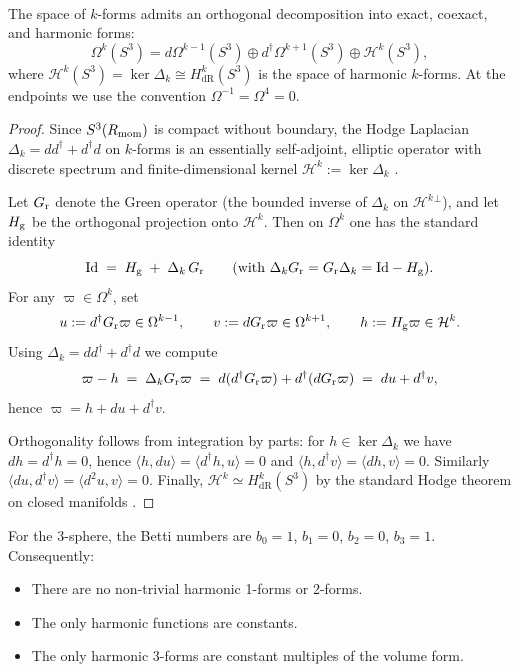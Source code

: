 \documentclass[11pt]{article}
\begin{document}
\begin{theorem}
\label{p1a:theorem:atlas-hodge-decomposition-a115d4d}

\mbox{}\\[6pt] 
The space of $k$-forms admits an orthogonal decomposition into exact, coexact, and harmonic forms:
\[
\Omega^k(S^3) = d\Omega^{k-1}(S^3) \oplus d^\dagger\Omega^{k+1}(S^3) \oplus \mathcal{H}^k(S^3),
\]
where $\mathcal{H}^k(S^3) = \ker \Delta_k \cong H_{\text{dR}}^k(S^3)$ is the space of harmonic $k$-forms. At the endpoints we use the convention $\Omega^{-1}=\Omega^4=0$.
\cite{warner1983foundations}
\end{theorem}
\begin{proof}
Since $S^3(R_{\mathrm{mom}})$ is compact without boundary, the Hodge Laplacian
$\Delta_k = dd^\dagger + d^\dagger d$ on $k$-forms is an essentially self-adjoint,
elliptic operator with discrete spectrum and finite-dimensional kernel
$\mathcal H^k:=\ker \Delta_k$ \cite{warner1983foundations,berline1992heat}.

Let $G_{\mathrm r}$ denote the Green operator (the bounded inverse of $\Delta_k$ on
$\mathcal H^k{}^\perp$), and let $H_{\mathrm g}$ be the orthogonal projection onto $\mathcal H^k$.
Then on $\Omega^k$ one has the standard identity
\[
\mathrm{Id} \;=\; H_{\mathrm g} \;+\; \Delta_k\, G_{\mathrm r}
\qquad\text{(with $\Delta_k G_{\mathrm r} = G_{\mathrm r} \Delta_k = \mathrm{Id}-H_{\mathrm g}$)}.
\]
For any $\varpi\in\Omega^k$, set
\[
u := d^\dagger G_{\mathrm r}\varpi \in \Omega^{k-1}, \qquad
v := d G_{\mathrm r}\varpi \in \Omega^{k+1}, \qquad
h := H_{\mathrm g}\varpi \in \mathcal H^k.
\]
Using $\Delta_k = dd^\dagger + d^\dagger d$ we compute
\[
\varpi - h \;=\; \Delta_k G_{\mathrm r}\varpi \;=\; d(d^\dagger G_{\mathrm r}\varpi) + d^\dagger(dG_{\mathrm r}\varpi)
\;=\; du + d^\dagger v,
\]
hence $\varpi = h + du + d^\dagger v$.

Orthogonality follows from integration by parts:
for $h\in\ker\Delta_k$ we have $dh=d^\dagger h=0$, hence
$\langle h,du\rangle=\langle d^\dagger h,u\rangle=0$ and
$\langle h,d^\dagger v\rangle=\langle dh,v\rangle=0$.
Similarly $\langle du,d^\dagger v\rangle=\langle d^2u,v\rangle=0$.
Finally, $\mathcal H^k\simeq H^k_{\mathrm{dR}}(S^3)$ by the standard Hodge theorem
on closed manifolds \cite{warner1983foundations}.
\end{proof}


\begin{corollary}[Cohomology]
\label{p1a:corollary:atlas-cohomology-e382521}

For the 3-sphere, the Betti numbers are $b_0 = 1$, $b_1 = 0$, $b_2 = 0$, $b_3 = 1$. Consequently:
\begin{itemize}
\item There are no non-trivial harmonic 1-forms or 2-forms.
\item The only harmonic functions are constants.
\item The only harmonic 3-forms are constant multiples of the volume form.
\end{itemize}
\cite{hatcher2002algebraic}
\end{corollary}
\end{document}
